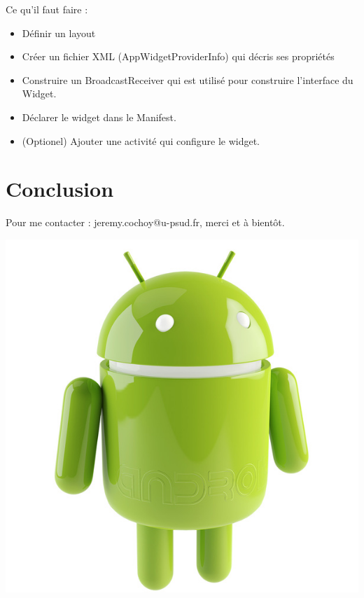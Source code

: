 \documentclass{beamer}
\begin{document}
\begin{frame}
Ce qu'il faut faire :
\begin{itemize}
\item Définir un layout
\item Créer un fichier XML (AppWidgetProviderInfo) qui décris ses propriétés
\item Construire un BroadcastReceiver qui est utilisé pour construire l'interface du Widget.
\item Déclarer le widget dans le Manifest.
\item (Optionel) Ajouter une activité qui configure le widget.
\end{itemize}
\end{frame}

\section{Conclusion}

\begin{frame}
\begin{center}
Pour me contacter : jeremy.cochoy@u-psud.fr, merci et à bientôt.

\medskip
\medskip
\medskip
\medskip

\includegraphics[scale=0.18]{android.jpg}
\end{center}
\end{frame}
\end{document}
